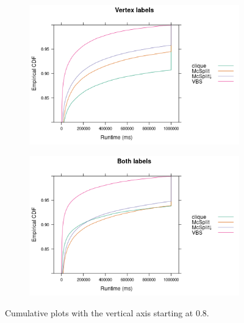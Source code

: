 \documentclass{l4proj}
\theoremstyle{definition}
\theoremstyle{remark}
\begin{document}
\begin{figure}
  \centering
  \begin{subfigure}[t]{0.49\textwidth}
    \centering
    \includegraphics[width=\textwidth]{images/ecdf_vertex_labels.png}
  \end{subfigure}
  \begin{subfigure}[t]{0.49\textwidth}
    \centering
    \includegraphics[width=\textwidth]{images/ecdf_both_labels.png}
  \end{subfigure}
  \caption{Cumulative plots with the vertical axis starting at 0.8.}
  \label{fig:ecdfs}
\end{figure}
\end{document}
